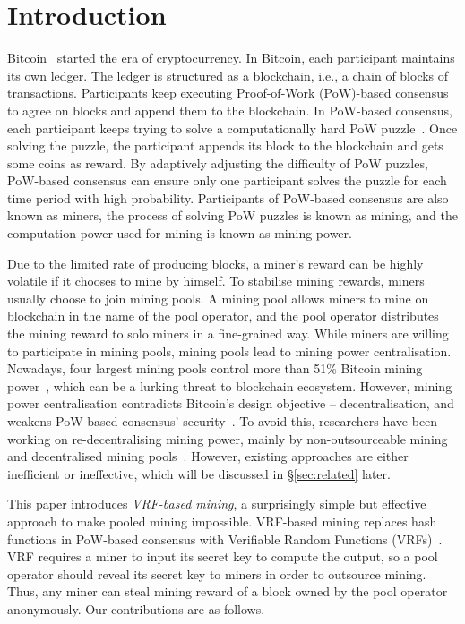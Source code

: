 \section{Introduction}
\label{sec:intro}

Bitcoin~\cite{nakamoto2008bitcoin} started the era of cryptocurrency.
In Bitcoin, each participant maintains its own ledger.
The ledger is structured as a blockchain, i.e., a chain of blocks of transactions.
Participants keep executing Proof-of-Work (PoW)-based consensus to agree on blocks and append them to the blockchain.
In PoW-based consensus, each participant keeps trying to solve a computationally hard PoW puzzle~\cite{dwork1992pricing}.
Once solving the puzzle, the participant appends its block to the blockchain and gets some coins as reward.
By adaptively adjusting the difficulty of PoW puzzles, PoW-based consensus can ensure only one participant solves the puzzle for each time period with high probability.
Participants of PoW-based consensus are also known as miners, the process of solving PoW puzzles is known as mining, and the computation power used for mining is known as mining power.

Due to the limited rate of producing blocks, a miner's reward can be highly volatile if it chooses to mine by himself.
To stabilise mining rewards, miners usually choose to join mining pools.
A mining pool allows miners to mine on blockchain in the name of the pool operator, and the pool operator distributes the mining reward to solo miners in a fine-grained way.
While miners are willing to participate in mining pools, mining pools lead to mining power centralisation.
Nowadays, four largest mining pools control more than 51\% Bitcoin mining power~\cite{btc-com}, which can be a lurking threat to blockchain ecosystem.
However, mining power centralisation contradicts Bitcoin's design objective -- decentralisation, and weakens PoW-based consensus' security~\cite{nakamoto2008bitcoin}\cite{eyal2018majority}.
To avoid this, researchers have been working on re-decentralising mining power, mainly by non-outsourceable mining~\cite{miller2015nonoutsourceable,2P-PoW} and decentralised mining pools~\cite{voight2011p2pool}\cite{luu2017smartpool}\cite{draft-bip-BetterHash}.
However, existing approaches are either inefficient or ineffective, which will be discussed in \S\ref{sec:related} later.

This paper introduces \textit{VRF-based mining}, a surprisingly simple but effective approach to make pooled mining impossible.
VRF-based mining replaces hash functions in PoW-based consensus with Verifiable Random Functions (VRFs)~\cite{micali1999verifiable}.
VRF requires a miner to input its secret key to compute the output, so a pool operator should reveal its secret key to miners in order to outsource mining.
Thus, any miner can steal mining reward of a block owned by the pool operator anonymously.
Our contributions are as follows.

